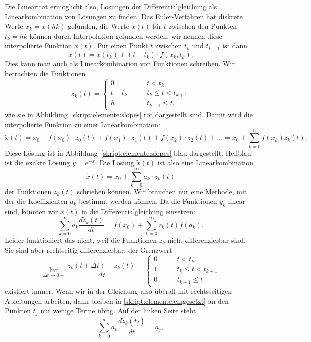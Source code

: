 Die Linearität ermöglicht also, Lösungen der Differentialgleichung
als Linearkombination von Lösungen zu finden.
Das Euler-Verfahren hat diskrete Werte $x_k=x(hk)$ gefunden,
die Werte $x(t)$ für $t$ zwischen den Punkten $t_k=hk$ können
durch Interpolation gefunden werden, wir nennen diese interpolierte
Funktion $\tilde{x}(t)$.
Für einen Punkt $t$ zwischen $t_k$ und $t_{k+1}$ ist dann
\[
\tilde{x}(t) = x(t_k) + (t-t_k)\cdot f(x_k, t_k).
\]
Dies kann man auch als Linearkombination von Funktionen
schreiben.
Wir betrachten die Funktionen
\[
z_k(t)
=
\begin{cases}
0&\qquad t < t_k\\
t-t_k&\qquad t_k \le t < t_{k+1}\\
h&\qquad t_{k+1} \le t,
\end{cases}
\]
wie sie in Abbildung~\ref{skript:elemente:slopes} rot dargestellt sind.
Damit wird die interpolierte Funktion zu einer Linearkombination:
\[
\tilde{x}(t)
=
x_0 + f(x_0)\cdot z_0(t) + f(x_1)\cdot z_1(t) + f(x_2) \cdot z_2(t) + \dots
=
x_0
+
\sum_{k=0}^n f(x_k) z_k(t).
\]
Diese Lösung ist in Abbildung~\ref{skript:elemente:slopes} blau dargestellt.
Hellblau ist die exakte Lösung $y=e^{-x}$.
Die Lösung $\tilde{x}(t)$ ist also eine Linearkombination
\[
\tilde x(t) = x_0 + \sum_{k=0}^\infty a_k\cdot z_k(t)
\]
der Funktionen $z_k(t)$ schrieben können.
Wir brauchen nur eine Methode, mit der die Koeffizienten $a_k$ bestimmt
werden können.
Da die Funktionen $y_k$ linear sind, könnten wir $\tilde{x}(t)$ in die 
Differentialgleichung einsetzen:
\begin{equation}
\sum_{k=0}^\infty
a_k\frac{d\tilde{z}_k(t)}{dt}
=
f(x_0) + \sum_{k=0}^\infty z_k(t) f(a_k).
\label{skript:elemente:eingesetzt}
\end{equation}
Leider funktioniert das nicht, weil die Funktionen $z_k$ nicht differenzierbar
sind.
Sie sind aber rechtseitig differenzierbar, der Grenzwert
\[
\lim_{\Delta t \to 0+} \frac{z_k(t+\Delta t)-z_k(t)}{\Delta t}
=
\begin{cases}
0&\qquad t<t_k\\
1&\qquad t_k\le t< t_{k+1}\\
0&\qquad t_{k+1} \le t
\end{cases}
\]
existiert immer.
Wenn wir in der Gleichung also überall mit rechtsseitigen Ableitungen
arbeiten, dann bleiben in \eqref{skript:elemente:eingesetzt} an den
Punkten $t_j$ nur wenige Terme übrig.
Auf der linken Seite steht
\begin{equation}
\sum_{k=0}^\infty
a_k\frac{d\tilde{z}_k(t_j)}{dt}
=
a_j,
\label{skript:elemente:links}
\end{equation}

